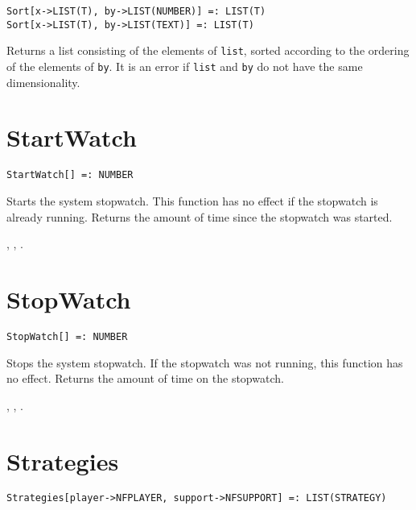 \newsignature

\begin{verbatim}
Sort[x->LIST(T), by->LIST(NUMBER)] =: LIST(T)
Sort[x->LIST(T), by->LIST(TEXT)] =: LIST(T)
\end{verbatim}
\foralltypes

\noindent
Returns a list consisting of the elements of \verb+list+, sorted
according to the ordering of the elements of \verb+by+.  It is an
error if \verb+list+ and \verb+by+ do not have the same dimensionality.


\section*{StartWatch}\label{PrimStartWatch}
\begin{verbatim}
StartWatch[] =: NUMBER 
\end{verbatim}

\noindent
Starts the system stopwatch.  This function has no
effect if the stopwatch is already running.
Returns the amount of time since the stopwatch was started.

\seealso {},
,
.


\section*{StopWatch}\label{PrimStopWatch}
\begin{verbatim}
StopWatch[] =: NUMBER 
\end{verbatim}

\noindent
Stops the system stopwatch.  If the stopwatch was not
running, this function has no effect.  Returns the amount of time
on the stopwatch.

\seealso {},
,
.


\section*{Strategies}\label{PrimStrategies}
\begin{verbatim}
Strategies[player->NFPLAYER, support->NFSUPPORT] =: LIST(STRATEGY) 
\end{verbatim}

